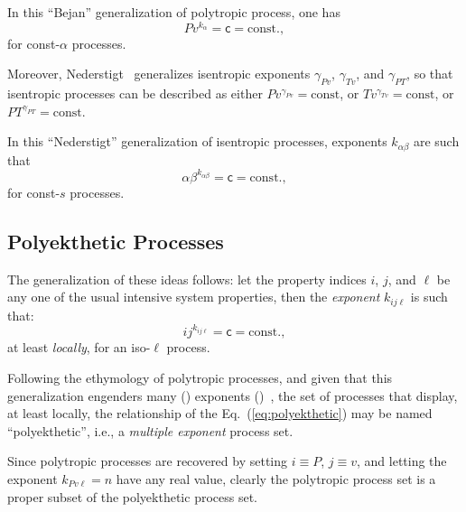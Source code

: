    In this ``Bejan'' generalization of polytropic process, one has
    \begin{equation}
        Pv^{k_{\alpha}} = \mathsf{c} = \mbox{const.},
        \label{eq:gen.Bejan}
    \end{equation}
    \noindent for const-$\alpha$ processes.

    Moreover,  Nederstigt~\cite{2017-NederstigtP-TUDelft}   generalizes   isentropic   exponents
    $\gamma_{Pv}$, $\gamma_{Tv}$,  and  $\gamma_{PT}$,  so  that  isentropic  processes  can  be
    described as either $Pv^{\gamma_{Pv}} = \mbox{const}$, or $Tv^{\gamma_{Tv}} = \mbox{const}$,
    or $PT^{\gamma_{PT}} = \mbox{const}$.

    In this ``Nederstigt'' generalization of isentropic processes,  exponents  $k_{\alpha\beta}$
    are such that
    \begin{equation}
        \alpha\beta^{k_{\alpha\beta}} = \mathsf{c} = \mbox{const.},
        \label{eq:gen.Nederstigt}
    \end{equation}
    \noindent for const-$s$ processes.

    \subsection{Polyekthetic Processes}

    The generalization of these ideas follows: let the property indices $i$, $j$, and $\ell$  be
    any one of the usual intensive system properties, then the \emph{exponent}  $k_{ij\ell}$  is
    such that:
    \begin{equation}
        ij^{k_{ij\ell}} = \mathsf{c} = \mbox{const.},
        \label{eq:polyekthetic}
    \end{equation}
    \noindent at least \emph{locally}, for an iso-$\ell$ process.

    Following the ethymology  of  polytropic  processes,  and  given  that  this  generalization
    engenders                  many                  ()                   exponents
    ()~\cite{1997-ManiatoglouMPF-Porto}, the set of processes that  display,  at
    least  locally,  the  relationship  of  the   Eq.~(\ref{eq:polyekthetic})   may   be   named
    ``polyekthetic'', i.e., a \emph{multiple exponent} process set.

    Since polytropic processes are recovered by setting $i \equiv P$, $j \equiv v$, and  letting
    the exponent $k_{Pv\ell} = n$ have any real value, clearly the polytropic process set  is  a
    proper subset of the polyekthetic process set.


